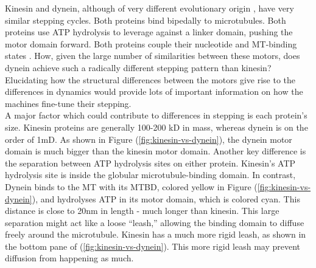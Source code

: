 \documentclass[
11pt, %
english, %
singlespacing, %
headsepline, %
chapterinoneline, %
]{MastersDoctoralThesis} %
\begin{document}
Kinesin and dynein, although of very different evolutionary origin \cite{hook-family}, have very similar stepping cycles. Both proteins bind bipedally to microtubules. Both proteins use ATP hydrolysis to leverage against a linker domain, pushing the motor domain forward. Both proteins couple their nucleotide and MT-binding states \cite{vale-kinesin-cycle}. How, given the large number of similarities between these motors, does dynein achieve such a radically different stepping pattern than kinesin? Elucidating how the structural differences between the motors give rise to the differences in dynamics would provide lots of important information on how the machines fine-tune their stepping.\\

A major factor which could contribute to differences in stepping is each protein's size. Kinesin proteins are generally 100-200 kD in mass, whereas dynein is on the order of 1mD. As shown in Figure (\ref{fig:kinesin-vs-dynein}), the dynein motor domain is much bigger than the kinesin motor domain. Another key difference is the separation between ATP hydrolysis sites on either protein. Kinesin's ATP hydrolysis site is inside the globular microtubule-binding domain. In contrast, Dynein binds to the MT with its MTBD, colored yellow in Figure (\ref{fig:kinesin-vs-dynein}), and hydrolyses ATP in its motor domain, which is colored cyan. This distance is close to 20nm in length - much longer than kinesin. This large separation might act like a loose ``leash,'' allowing the binding domain to diffuse freely around the microtubule. Kinesin has a much more rigid leash, as shown in the bottom pane of (\ref{fig:kinesin-vs-dynein}). This more rigid leash may prevent diffusion from happening as much.\\
\end{document}
